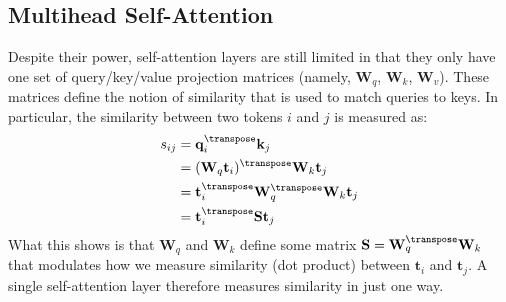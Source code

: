 \subsection{Multihead Self-Attention}
Despite their power, self-attention layers are still limited in that they only have one set of query/key/value projection matrices (namely, $\mathbf{W}_q$, $\mathbf{W}_k$, $\mathbf{W}_v$). These matrices define the notion of similarity that is used to match queries to keys. In particular, the similarity between two tokens $i$ and $j$ is measured as:
\begin{align}
    s_{ij} & = \mathbf{q}_i^\transpose \mathbf{k}_j                                     \\
           & = (\mathbf{W}_q \mathbf{t}_i)^\transpose \mathbf{W}_k \mathbf{t}_j         \\
           & = \mathbf{t}_i^\transpose\mathbf{W}_q^\transpose \mathbf{W}_k \mathbf{t}_j \\
           & = \mathbf{t}_i^\transpose\mathbf{S}\mathbf{t}_j
\end{align}
What this shows is that $\mathbf{W}_q$ and $\mathbf{W}_k$ define some matrix $\mathbf{S} = \mathbf{W}_q^\transpose \mathbf{W}_k$ that modulates how we measure similarity (dot product) between $\mathbf{t}_i$ and $\mathbf{t}_j$. A single self-attention layer therefore measures similarity in just one way.

